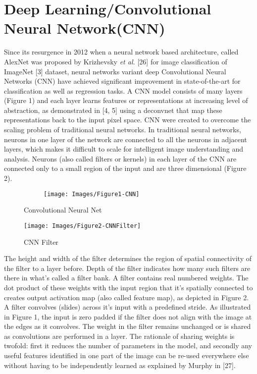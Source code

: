 \documentclass [11pt,letterpaper ,twoside ,openany ]{report}
\begin{document}
    \chapter{Deep Learning/Convolutional Neural Network(CNN)}
    \doublespacing
    Since its resurgence in 2012 when a neural network based architecture, called AlexNet was proposed by Krizhevsky \textit {et al.} [26] for image classification of ImageNet [3] dataset, neural networks variant deep Convolutional Neural Networks (CNN) have achieved significant improvement in state-of-the-art for classification as well as regression tasks. A CNN model consists of many layers (Figure 1) and each layer learns features or representations at increasing level of abstraction, as demonstrated in [4, 5] using a deconvnet that map these representations back to the input pixel space. CNN were created to overcome the scaling problem of traditional neural networks. In traditional neural networks, neurons in one layer of the network are connected to all the neurons in adjacent layers, which makes it difficult to scale for intelligent image understanding and analysis.  Neurons (also called filters or kernels) in each layer of the CNN are connected only to a small region of the input and are three dimensional (Figure 2). 

    \begin{figure}[h]
      \centering
      \begin{subfigure}[b]{0.90\linewidth}
        \texttt{[image: Images/Figure1-CNN]}
      \end{subfigure}
      \caption{Convolutional Neural Net}
      \label{fig:cnn}
    \end{figure}


    \begin{wrapfigure}{l}{0.5\textwidth}
        \begin{center}
            \texttt{[image: Images/Figure2-CNNFilter]}
        \end{center}
        \caption{CNN Filter}
    \end{wrapfigure}

    The height and width of the filter determines the region of spatial connectivity of the filter to a layer before. Depth of the filter indicates how many such filters are there in what's called a filter bank. A filter contains real numbered weights. The dot product of these weights with the input region that it's spatially connected to creates output activation map (also called feature map), as depicted in Figure 2. A filter convolves (slides) across it's input with a predefined stride. As illustrated in Figure 1, the input is zero padded if the filter  does not align with the image at the edges as it convolves. The weight in the filter remains unchanged or is shared as convolutions are performed in a layer. The rationale of sharing weights is twofold: first it reduces the number of parameters in the model, and secondly any useful features identified in one part of the image can be re-used everywhere else without having to be independently learned as explained by Murphy in [27].\\
\end{document}

